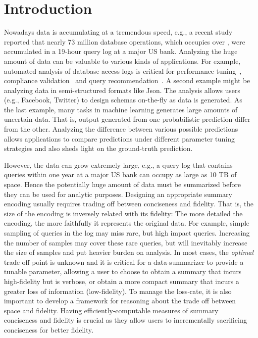 \chapter{Introduction}\label{chap:intro}
Nowadays data is accumulating at a tremendous speed, e.g., a recent study~\cite{DBLP:conf/www/KulLXCCKU16} reported that nearly 73 million database operations, which occupies over , were accumulated in a 19-hour query log at a major US bank. 
Analyzing the huge amount of data can be valuable to various kinds of applications.
For example, automated analysis of database access logs is critical for performance tuning~\cite{}, compliance validation~\cite{} and query recommendation~\cite{}.
A second example might be analyzing data in semi-structured formats like Json. 
The analysis allows users (e.g., Facebook, Twitter) to design schemas on-the-fly as data is generated.
As the last example, many tasks in machine learning generates large amounts of uncertain data.
That is, output generated from one probabilistic prediction differ from the other.
Analyzing the difference between various possible predictions allows applications to compare predictions under different parameter tuning strategies and also sheds light on the ground-truth prediction.

However, the data can grow extremely large, e.g., a query log that contains queries within one year at a major US bank can occupy as large as 10 TB of space. 
Hence the potentially huge amount of data must be summarized before they can be used for analytic purposes. 
Designing an appropriate summary encoding usually requires trading off between conciseness and fidelity.
That is, the size of the encoding is inversely related with its fidelity: The more detailed the encoding, the more faithfully it represents the original data.
For example, simple sampling of queries in the log may miss rare, but high impact queries.
Increasing the number of samples may cover these rare queries, but will inevitably increase the size of samples and put heavier burden on analysis.
In most cases, the \emph{optimal} trade off point is unknown and it is critical for a data-summarizer to provide a tunable parameter, allowing a user to choose to obtain a summary that incurs high-fidelity but is verbose, or obtain a more compact summary that incurs a greater loss of information (low-fidelity).
To manage the loss-rate, it is also important to develop a framework for reasoning about the trade off between space and fidelity.
Having efficiently-computable measures of summary conciseness and fidelity is crucial as they allow users to incrementally sacrificing conciseness for better fidelity.

